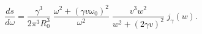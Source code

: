 \begin{equation} \label{hsC} 
\frac{d s}{d\omega}= 
\frac{\gamma ^3}{2\pi ^3 R_{0}^{3}}\; 
\frac{\omega ^2+(\gamma v \omega _{0})^2}{\omega ^2}\; 
\frac{v^3w^2}{w^2+(2\gamma v)^2}\; 
j_{\gamma}(w). 
\end{equation} 
